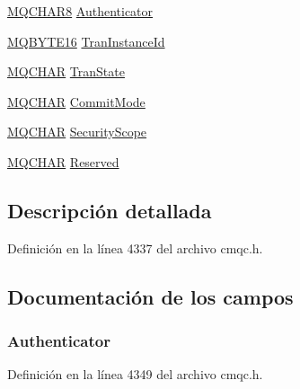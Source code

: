 \begin{DoxyCompactItemize}
\item 
\hyperlink{cmqc_8h_abddcedb8c41fa262f2bd05dfec3e60a5}{M\+Q\+C\+H\+A\+R8} \hyperlink{structtag_m_q_i_i_h_a17dd634a073ce3c302375cc231a4fcfa}{Authenticator}
\item 
\hyperlink{cmqc_8h_afe5ed2c1b7363c2d8f3c068787be6c5d}{M\+Q\+B\+Y\+T\+E16} \hyperlink{structtag_m_q_i_i_h_aa6e8ee527bdecf4daf2b784caeebf996}{Tran\+Instance\+Id}
\item 
\hyperlink{cmqc_8h_aeb12bc7ba416a4eb603e2a74351418d2}{M\+Q\+C\+H\+A\+R} \hyperlink{structtag_m_q_i_i_h_ab37c3f1862147c56720563481605b360}{Tran\+State}
\item 
\hyperlink{cmqc_8h_aeb12bc7ba416a4eb603e2a74351418d2}{M\+Q\+C\+H\+A\+R} \hyperlink{structtag_m_q_i_i_h_a24abe6b52c8bd4d61e986bc4cbd21055}{Commit\+Mode}
\item 
\hyperlink{cmqc_8h_aeb12bc7ba416a4eb603e2a74351418d2}{M\+Q\+C\+H\+A\+R} \hyperlink{structtag_m_q_i_i_h_a13583ad1cfb9973369dff57b50da6918}{Security\+Scope}
\item 
\hyperlink{cmqc_8h_aeb12bc7ba416a4eb603e2a74351418d2}{M\+Q\+C\+H\+A\+R} \hyperlink{structtag_m_q_i_i_h_a46c61c67b777dd2428e34fa6f407bef3}{Reserved}
\end{DoxyCompactItemize}


\subsection{Descripción detallada}


Definición en la línea 4337 del archivo cmqc.\+h.



\subsection{Documentación de los campos}
\hypertarget{structtag_m_q_i_i_h_a17dd634a073ce3c302375cc231a4fcfa}{}
\subsubsection[{Authenticator}]{ Authenticator}\label{structtag_m_q_i_i_h_a17dd634a073ce3c302375cc231a4fcfa}


Definición en la línea 4349 del archivo cmqc.\+h.

\hypertarget{structtag_m_q_i_i_h_a4d8d1961a991850d1355cdf9b4680b8e}{}
